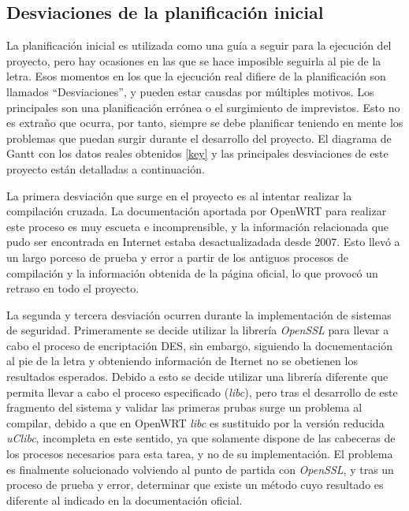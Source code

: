 \documentclass[12pt]{article}
\begin{document}
    \subsection{Desviaciones de la planificación inicial}
        La planificación inicial es utilizada como una guía a seguir para la ejecución del proyecto, pero hay ocasiones en las que se hace imposible seguirla al pie de la letra. Esos momentos en los que la ejecución real difiere de la planificación son llamados ``Desviaciones'', y pueden estar causdas por múltiples motivos. Los principales son una planificación errónea o el surgimiento de imprevistos. Esto no es extraño que ocurra, por tanto, siempre se debe planificar teniendo en mente los problemas que puedan surgir durante el desarrollo del proyecto. El diagrama de Gantt con los datos reales obtenidos \ref{key} y las principales desviaciones de este proyecto están detalladas a continuación.

        La primera desviación que surge en el proyecto es al intentar realizar la compilación cruzada. La documentación aportada por OpenWRT para realizar este proceso es muy escueta e incomprensible, y la información relacionada que pudo ser encontrada en Internet estaba desactualizadada desde 2007. Esto llevó a un largo porceso de prueba y error a partir de los antiguos procesos de compilación y la información obtenida de la página oficial, lo que provocó un retraso en todo el proyecto.

        La segunda y tercera desviación ocurren durante la implementación de sistemas de seguridad. Primeramente se decide utilizar la librería \textit{OpenSSL} para llevar a cabo el proceso de encriptación DES, sin embargo, siguiendo la docuementación al pie de la letra y obteniendo información de Iternet no se obetienen los resultados esperados. Debido a esto se decide utilizar una librería diferente que permita llevar a cabo el proceso especificado (\textit{libc}), pero tras el desarrollo de este fragmento del sistema y validar las primeras prubas surge un problema al compilar, debido a que en OpenWRT \textit{libc} es sustituido por la versión reducida \textit{uClibc}, incompleta en este sentido, ya que solamente dispone de las cabeceras de los procesos necesarios para esta tarea, y no de su implementación. El problema es finalmente solucionado volviendo al punto de partida con \textit{OpenSSL}, y tras un proceso de prueba y error, determinar que existe un método cuyo resultado es diferente al indicado en la documentación oficial.
\end{document}
